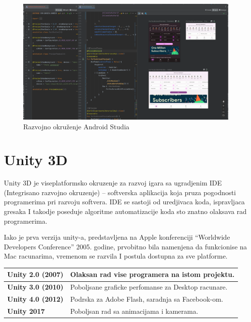 \documentclass[12pt]{article}
\begin{document}
\begin{figure}[ht!]
    \centering
    \includegraphics[scale=0.3]{android_studio_interface.png}
    \caption{Razvojno okruženje Android Studia}
\end{figure}

\section{Unity 3D}

Unity 3D je viseplatformsko okruzenje za razvoj igara sa ugradjenim IDE (Integrisano razvojno okruzenje) – softverska aplikacija koja pruza pogodnosti programerima pri razvoju softvera. IDE se sastoji od uredjivaca koda, ispravljaca gresaka I takodje poseduje algoritme automatizacije koda sto 
znatno olaksava rad programerima.

Iako je prva verzija unity-a, predstavljena na Apple konferenciji “Worldwide Developers Conference” 2005. godine, prvobitno bila namenjena da funkcionise na Mac racunarima, vremenom se razvila I postula dostupna za sve platforme. 

\begin{table}[ht!]
\begin{tabular}{|l|l|}
\hline
\multicolumn{1}{|c|}{\textbf{Unity 2.0 (2007)}} & Olaksan rad vise programera na istom projektu.\\ \hline
\textbf{Unity 3.0 (2010)}                       & Poboljsane graficke perfomanse za Desktop racunare.                               \\ \hline
\textbf{Unity 4.0 (2012)}                       & Podrska za Adobe Flash, saradnja sa Facebook-om. \\ \hline
\textbf{Unity 2017}                             & Poboljsan rad sa animacijama i kamerama. \\ \hline
\end{tabular}
\end{table}
\end{document}

